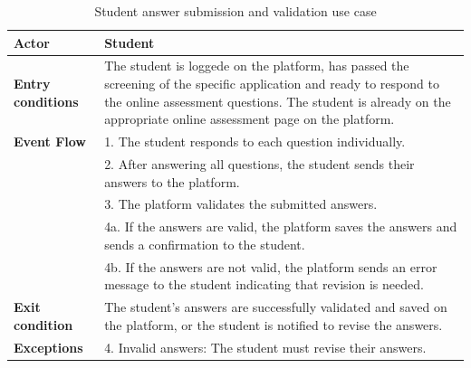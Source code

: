 \begin{table}[h!]
    \centering
    \begin{tabular}{lp{10cm}}
        \textbf{Actor} & Student \\ \hline
        \textbf{Entry conditions} & The student is loggede on the platform, has passed the screening of the specific application and ready to respond to the online assessment questions. The student is already on the appropriate online assessment page on the platform.  \\ \hline
        \textbf{Event Flow} &
        1. The student responds to each question individually. \\
        & 2. After answering all questions, the student sends their answers to the platform. \\
        & 3. The platform validates the submitted answers. \\
        & 4a. If the answers are valid, the platform saves the answers and sends a confirmation to the student. \\
        & 4b. If the answers are not valid, the platform sends an error message to the student indicating that revision is needed. \\
        \hline
        \textbf{Exit condition} & The student's answers are successfully validated and saved on the platform, or the student is notified to revise the answers. \\ \hline
        \textbf{Exceptions} &
        4. Invalid answers: The student must revise their answers. \\
    \end{tabular}
    \caption{Student answer submission and validation use case}
    \label{tab:student_answer_submission}
\end{table}


